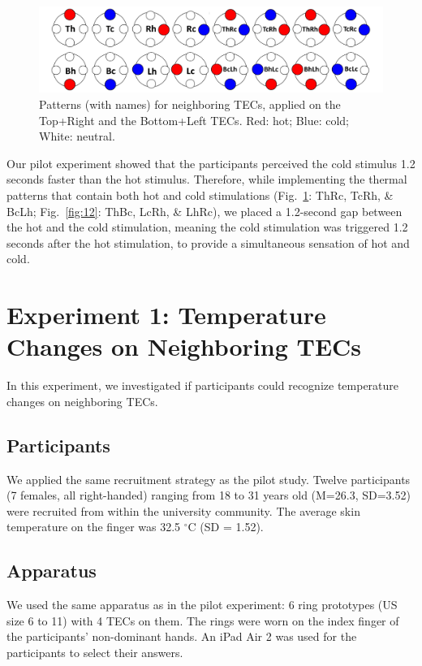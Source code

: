 \documentclass[preprint,12pt]{elsarticle}
\begin{document}
\begin{figure}[tp]
  \centering
  \includegraphics[width=0.9\columnwidth]{img/fig9.pdf}
  \caption{Patterns (with names) for neighboring TECs, applied on the Top+Right and the Bottom+Left TECs. Red: hot; Blue: cold; White: neutral.}
  \label{fig:9}
\end{figure}

Our pilot experiment showed that the participants perceived the cold stimulus 1.2 seconds faster than the hot stimulus. Therefore, while implementing the thermal patterns that contain both hot and cold stimulations (Fig.~\ref{fig:9}: ThRc, TcRh, \& BcLh; Fig.~\ref{fig:12}: ThBc, LcRh, \& LhRc), we placed a 1.2-second gap between the hot and the cold stimulation, meaning the cold stimulation was triggered 1.2 seconds after the hot stimulation, to provide a simultaneous sensation of hot and cold.

\section{Experiment 1: Temperature Changes on Neighboring TECs}
In this experiment, we investigated if participants could recognize temperature changes on neighboring TECs.

\subsection{Participants}
We applied the same recruitment strategy as the pilot study. Twelve participants (7 females, all right-handed) ranging from 18 to 31 years old (M=26.3, SD=3.52) were recruited from within the university community. The average skin temperature on the finger was 32.5 $^{\circ}$C (SD = 1.52).

\subsection{Apparatus}
We used the same apparatus as in the pilot experiment: 6 ring prototypes (US size 6 to 11) with 4 TECs on them. The rings were worn on the index finger of the participants' non-dominant hands. An iPad Air 2 was used for the participants to select their answers.
\end{document}
